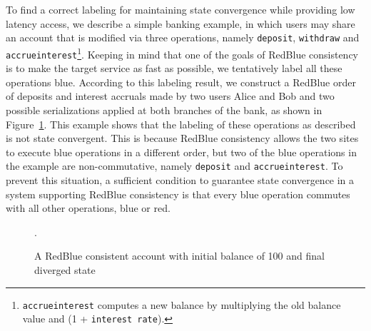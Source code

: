\documentclass[11pt]{article}
\begin{document}
To find a correct labeling for maintaining state convergence while providing low latency access, we describe a
simple banking example, in which users may share an account that is modified
via three operations, namely {\tt deposit}, {\tt withdraw} and {\tt accrueinterest}\footnote{{\tt accrueinterest}
computes a new balance by multiplying the old balance value and (1 + {\tt interest rate}).}. Keeping in mind that one of the goals of RedBlue consistency is to make the target service as fast as possible, we tentatively
label all these operations blue. According to this labeling result, we construct a RedBlue order of deposits and interest accruals made by two users Alice and Bob and two possible serializations applied at both branches
of the bank, as shown in Figure~\ref{fig:bankexample}. This example shows that the labeling of these operations as described is not state convergent. This is because
RedBlue consistency allows the two sites to execute blue operations in a different order, but
two of the blue operations in the example are non-commutative, namely
{\tt deposit} and {\tt accrueinterest}. To prevent this situation, a sufficient condition to guarantee
state convergence in a system supporting RedBlue consistency is that every blue operation commutes with all other operations, blue or red.

\begin{figure}[t]
\centering
\begin{minipage}[t]{0.46\columnwidth}
\centering
{}
\end{minipage}
\begin{minipage}[t]{0.46\columnwidth}
\centering
{}
\end{minipage}
\caption{A RedBlue consistent account with initial balance of 100 and final diverged state}.
\label{fig:bankexample}
\end{figure}
\end{document}
